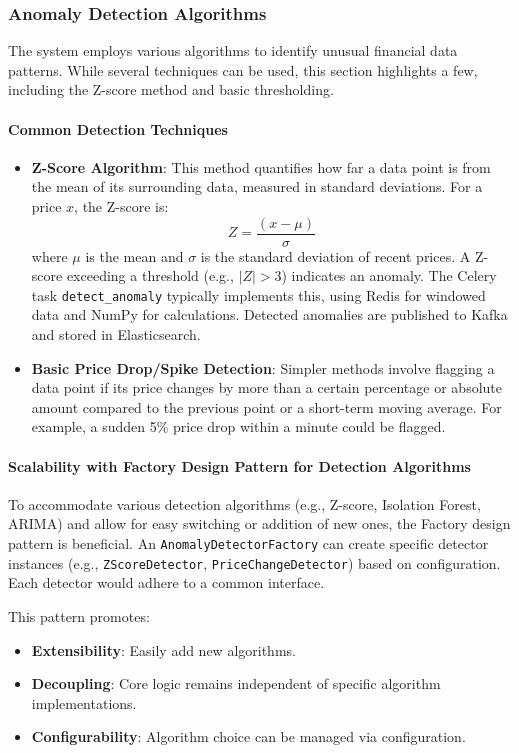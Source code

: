 \subsubsection{Anomaly Detection Algorithms}

The system employs various algorithms to identify unusual financial data patterns. While several techniques can be used, this section highlights a few, including the Z-score method and basic thresholding.

\paragraph{Common Detection Techniques}
\begin{itemize}
    \item \textbf{Z-Score Algorithm}: This method quantifies how far a data point is from the mean of its surrounding data, measured in standard deviations. For a price $x$, the Z-score is:
    \[ Z = \frac{(x - \mu)}{\sigma} \]
    where $\mu$ is the mean and $\sigma$ is the standard deviation of recent prices. A Z-score exceeding a threshold (e.g., $|Z| > 3$) indicates an anomaly. The Celery task \texttt{detect\_anomaly} typically implements this, using Redis for windowed data and NumPy for calculations. Detected anomalies are published to Kafka and stored in Elasticsearch.

    \item \textbf{Basic Price Drop/Spike Detection}: Simpler methods involve flagging a data point if its price changes by more than a certain percentage or absolute amount compared to the previous point or a short-term moving average. For example, a sudden 5\% price drop within a minute could be flagged.
\end{itemize}

\paragraph{Scalability with Factory Design Pattern for Detection Algorithms}
To accommodate various detection algorithms (e.g., Z-score, Isolation Forest, ARIMA) and allow for easy switching or addition of new ones, the Factory design pattern is beneficial. An \texttt{AnomalyDetectorFactory} can create specific detector instances (e.g., \texttt{ZScoreDetector}, \texttt{PriceChangeDetector}) based on configuration. Each detector would adhere to a common interface.

This pattern promotes:
\begin{itemize}
    \item \textbf{Extensibility}: Easily add new algorithms.
    \item \textbf{Decoupling}: Core logic remains independent of specific algorithm implementations.
    \item \textbf{Configurability}: Algorithm choice can be managed via configuration.
\end{itemize}

